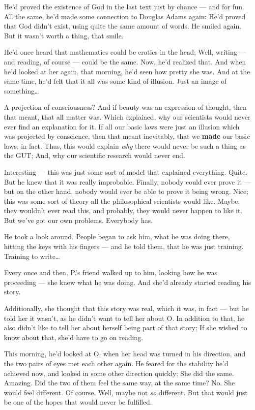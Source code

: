He'd proved the existence of God in the last text just by chance --- and for fun. 
All the same, he'd made some connection to Douglas Adams again: He'd proved that God didn't exist, using quite the same amount of words. 
He smiled again. 
But it wasn't worth a thing, that smile.

He'd once heard that mathematics could be erotics in the head; Well, writing --- and reading, of course --- could be the same. 
Now, he'd realized that. And when he'd looked at her again, that morning, he'd seen how pretty she was. And at the same time, he'd felt that it all was some kind of illusion. 
Just an image of something\ldots

A projection of consciousness?
And if beauty was an expression of thought, then that meant, that all matter was. 
Which explained, why our scientists would never ever find an explanation for it. 
If all our basic laws were just an illusion which was projected by conscience, then that meant inevitably, that we \textbf{made} our basic laws, in fact. Thus, this would explain \emph{why} there would never be such a thing as the GUT; And, why our scientific research would never end.

Interesting --- this was just some sort of model that explained everything. Quite. 
But he knew that it was really improbable. 
Finally, nobody could ever prove it --- but on the other hand, nobody would ever be able to prove it being wrong. 
Nice; this was some sort of theory all the philosophical scientists would like. 
Maybe, they wouldn't ever read this, and probably, they would never happen to like it. 
But we've got our own problems. Everybody has.

He took a look around. People began to ask him, what he was doing there, hitting the keys with his fingers --- and he told them, that he was just training. 
Training to write\ldots

Every once and then, P.'s friend walked up to him, looking how he was proceeding --- she knew what he was doing. 
And she'd already started reading his story.

Additionally, she thought that this story was real, which it was, in fact --- but he told her it wasn't, as he didn't want to tell her about O. In addition to that, he also didn't like to tell her about herself being part of that story; If she wished to know about that, she'd have to go on reading.

This morning, he'd looked at O. when her head was turned in his direction, and the two pairs of eyes met each other again. 
He feared for the stability he'd achieved now, and looked in some other direction quickly; She did the same. 
Amazing. 
Did the two of them feel the same way, at the same time?
No. 
She would feel different. 
Of course. 
Well, maybe not \emph{so} different. 
But that would just be one of the hopes that would never be fulfilled.

